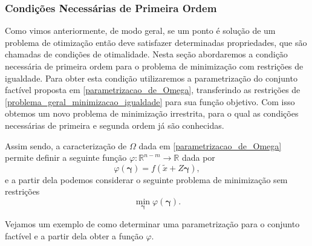 \documentclass[12pt,a4paper]{scrartcl}
\def\RR{\mathds{R}}
\theoremstyle{definition}%
\begin{document}
\subsubsection{Condições Necessárias de Primeira Ordem} \label{subsection:condicoes_1ordem_igualdade}

Como vimos anteriormente, de modo geral, se um ponto é solução de um problema de otimização então deve satisfazer determinadas propriedades, que são chamadas de condições de otimalidade. Nesta seção abordaremos a condição necessária de primeira ordem para o problema de minimização com restrições de igualdade. Para obter esta condição utilizaremos a parametrização do conjunto factível proposta em \eqref{parametrizacao_de_Omega}, transferindo as restrições de \eqref{problema_geral_minimizacao_igualdade} para sua função objetivo. Com isso obtemos um novo problema de minimização irrestrita, para o qual as condições necessárias de primeira e segunda ordem já são conhecidas.

Assim sendo, a caracterização de $\Omega$ dada em \eqref{parametrizacao_de_Omega} permite definir a seguinte função $\varphi : \RR^{n-m} \rightarrow \RR$ dada por
\[ \label{funcao_phi_restricoes_igualdade}
\varphi (\boldsymbol{\gamma}) = f(\tilde{x} + Z\boldsymbol{\gamma}),
\]
e a partir dela podemos considerar o seguinte problema de minimização sem restrições
\[ \label{problema_minimizacao_irrestrita_phi}
\min_{\boldsymbol{\gamma}} \varphi (\boldsymbol{\gamma}) .
\]

Vejamos um exemplo de como determinar uma parametrização para o conjunto factível e a partir dela obter a função $\varphi$.
\end{document}
